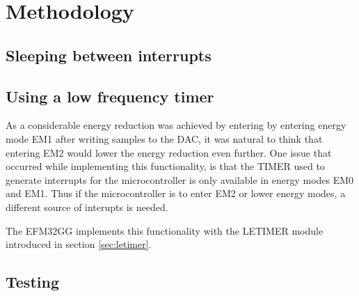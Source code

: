 \chapter{Methodology}


\section{Sleeping between interrupts}

\section{Using a low frequency timer}
As a considerable energy reduction was achieved by entering by entering energy mode EM1 after writing samples to the DAC, it was natural to think that entering EM2 would lower the energy reduction even further. One issue that occurred while implementing this functionality, is that the TIMER used to generate interrupts for the microcontroller is only available in energy modes EM0 and EM1. Thus if the microcontroller is to enter EM2 or lower energy modes, a different source of interupts is needed.

The EFM32GG implements this functionality with the LETIMER module introduced in section \ref{sec:letimer}.


\section{Testing}

